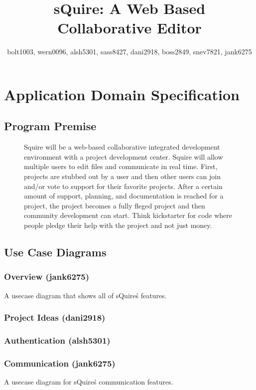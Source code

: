 \documentclass[11pt]{report}
\title{sQuire: A Web Based Collaborative Editor}
\author{bolt1003, wern0096, alsh5301, sass8427, dani2918, boss2849, snev7821, jank6275}
\begin{document}
\maketitle
\tableofcontents
\chapter{Application Domain Specification}
\section{Program Premise}
\begin{figure}[h!]
\caption{Squire will be a web-based collaborative integrated development environment with a project development center. Squire will allow multiple users to edit files and communicate in real time. First, projects are stubbed out by a user and then other users can join and/or vote to support for their favorite projects. After a certain amount of support, planning, and documentation is reached for a project, the project becomes a fully fleged project and then community development can start. Think kickstarter for code where people pledge their help with the project and not just money.}
\end{figure}

\section{Use Case Diagrams}
\subsection{Overview (jank6275)}
A usecase diagram that shows all of sQuire\'s features.
\subsection{Project Ideas (dani2918)}
\subsection{Authentication (alsh5301)}
\subsection{Communication (jank6275)}
A usecase diagram for sQuire\'s communication features.
\end{document}
